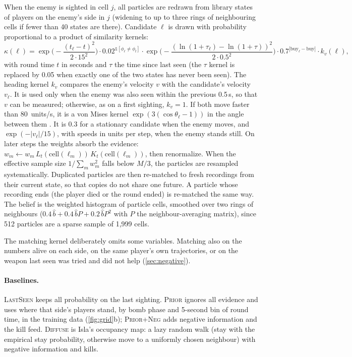 \documentclass[11pt]{article}
\newcommand{\model}[1]{\textsc{#1}}
\newcommand{\1}{\mathbb{1}}
\begin{document}
When the enemy is sighted in cell $j$, all particles are redrawn from library states of players on the enemy's side in $j$ (widening to up to three rings of neighbouring cells if fewer than 40 states are there). Candidate $\ell$ is drawn with probability proportional to a product of similarity kernels:
\begin{equation}
  \kappa(\ell) = \exp\!\Big(-\frac{(t_\ell - t)^2}{2 \cdot 15^2}\Big) \cdot 0.02^{\1[\phi_\ell \neq \phi_t]} \cdot \exp\!\Big(-\frac{(\ln(1+\tau_\ell) - \ln(1+\tau))^2}{2 \cdot 0.5^2}\Big) \cdot 0.7^{|\mathrm{buy}_\ell - \mathrm{buy}|} \cdot k_v(\ell),
  \label{eq:kernel}
\end{equation}
with round time $t$ in seconds and $\tau$ the time since last seen (the $\tau$ kernel is replaced by 0.05 when exactly one of the two states has never been seen). The heading kernel $k_v$ compares the enemy's velocity $v$ with the candidate's velocity $v_\ell$. It is used only when the enemy was also seen within the previous 0.5\,s, so that $v$ can be measured; otherwise, as on a first sighting, $k_v = 1$. If both move faster than 80~units/s, it is a von Mises kernel $\exp(3(\cos\theta_\ell - 1))$ in the angle between them \citep{mardia2000directional}. It is 0.3 for a stationary candidate when the enemy moves, and $\exp(-|v_\ell|/15)$, with speeds in units per step, when the enemy stands still. On later steps the weights absorb the evidence: $w_m \leftarrow w_m\, L_t(\mathrm{cell}(\ell_m))\, K_t(\mathrm{cell}(\ell_m))$, then renormalize. When the effective sample size $1/\sum_m w_m^2$ falls below $M/3$, the particles are resampled systematically. Duplicated particles are then re-matched to fresh recordings from their current state, so that copies do not share one future. A particle whose recording ends (the player died or the round ended) is re-matched the same way. The belief is the weighted histogram of particle cells, smoothed over two rings of neighbours ($0.4\,\hat b + 0.4\,\hat b P + 0.2\,\hat b P^2$ with $P$ the neighbour-averaging matrix), since 512 particles are a sparse sample of 1{,}999 cells.

The matching kernel deliberately omits some variables. Matching also on the numbers alive on each side, on the same player's own trajectories, or on the weapon last seen was tried and did not help (\cref{sec:negative}).

\paragraph{Baselines.} \model{LastSeen} keeps all probability on the last sighting. \model{Prior} ignores all evidence and uses where that side's players stand, by bomb phase and 5-second bin of round time, in the training data (\cref{fig:grid}b); \model{Prior+Neg} adds negative information and the kill feed. \model{Diffuse} is Isla's occupancy map: a lazy random walk (stay with the empirical stay probability, otherwise move to a uniformly chosen neighbour) with negative information and kills.
\end{document}

